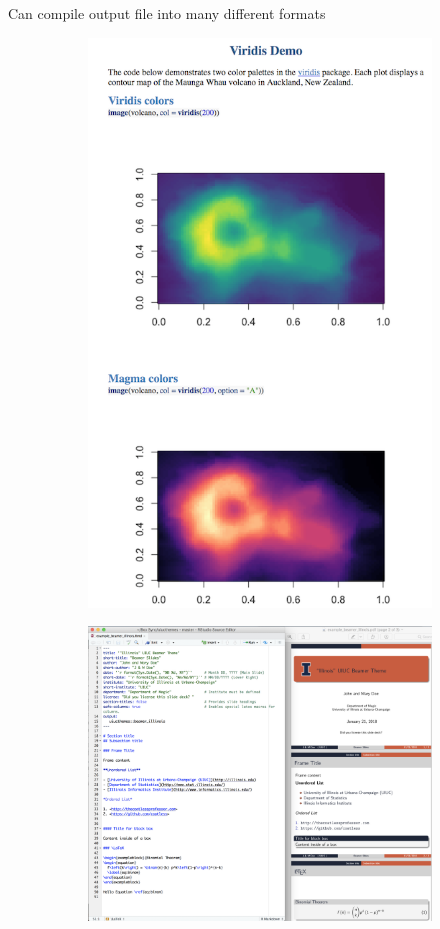 \documentclass[xcolor=dvipsnames]{beamer}
\begin{document}
\begin{frame}
\frametitle{\insertsectionhead}
Can compile output file into many different formats
\begin{figure}
	\centering
	\begin{subfigure}[t!]{0.49\textwidth}
	\centering
		\includegraphics[width=0.75\linewidth]{images/rmd_doc.png}
	\end{subfigure}%
	\hfill
	\begin{subfigure}[t!]{0.49\textwidth}
	\centering
		\includegraphics[width=1\linewidth]{images/rmd_slides.png}
	\end{subfigure}
\end{figure}
\end{frame}
\end{document}

